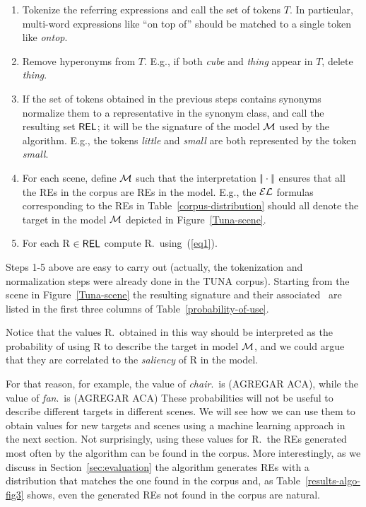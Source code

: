 \vspace*{-.4cm}
\begin{enumerate}
\item Tokenize the referring expressions and call the set of tokens $T$. In particular, multi-word expressions like ``on top of'' 
should be matched to a single token like \emph{ontop}.\\[-1.9em]

\item Remove hyperonyms from $T$. E.g., if both \emph{cube} and \emph{thing} appear in $T$, delete \emph{thing}.\\[-2em]

\item If the set of tokens obtained in the previous steps contains synonyms normalize them to a representative in the synonym class, 
and call the resulting set $\textsf{REL}$; it will be the signature of the model $\mathcal{M}$ used by the algorithm. E.g., the tokens \emph{little} 
and \emph{small} are both represented by the token \emph{small}.\\[-1.9em]

\item For each scene, define $\mathcal{M}$ such that the interpretation $|\!|\cdot|\!|$ ensures that all the REs in the corpus are REs in the model.
 E.g., the $\mathcal{EL}$ formulas corresponding to the REs in Table~\ref{corpus-distribution} should all denote the target in the model $\mathcal{M}$ 
depicted in 
Figure~\ref{Tuna-scene}.\\[-1.9em]

\item For each R $\in \textsf{REL}$ compute R.\puse\ using~(\ref{eq1}).\\[-1.9em]

\end{enumerate}

Steps 1-5 above are easy to carry out (actually, the tokenization and normalization steps were already done in the TUNA corpus). 
Starting from the scene in Figure~\ref{Tuna-scene}
the resulting signature and their associated \puse\ are listed in the first three columns of Table~\ref{probability-of-use}. 

Notice that the values R.\puse\ obtained in this way should be interpreted as the probability of using R to describe the target in model 
$\mathcal{M}$, and we could argue that they are correlated to the \emph{saliency} of R in the model.  

For that reason, for example, the value of \emph{chair}.\puse\ is (AGREGAR ACA), while the value of \emph{fan}.\puse\ is (AGREGAR ACA)  
These probabilities will not be useful to describe different targets in different scenes. We will see how we can use them to obtain
 values for new targets and scenes using a machine learning approach in the next section. Not surprisingly, using these values for 
R.\puse\ the REs generated most often by the algorithm can be found in the corpus. More interestingly, as we discuss in 
Section~\ref{sec:evaluation} the algorithm generates REs with a distribution that matches the one found in the corpus and, 
as Table~\ref{results-algo-fig3} shows, even the generated REs not found in the corpus are natural.    


